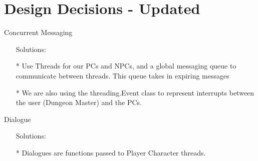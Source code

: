 \documentclass{article}
\theoremstyle{definition}
\begin{document}
\section*{Design Decisions - Updated}

Concurrent Messaging
	\begin{enumerate}
	\item[ ] Solutions:
	\item[*] Use Threads for our PCs and NPCs, and a global messaging
	      queue to communicate between threads. This queue takes in expiring
        messages
  \item[*] We are also using the threading.Event class to represent interrupts
           between the user (Dungeon Master) and the PCs.
	\end{enumerate}
Dialogue
	\begin{enumerate}
	\item[ ] Solutions:
	\item[*] Dialogues are functions passed to Player Character threads.
	\end{enumerate}
\end{document}
